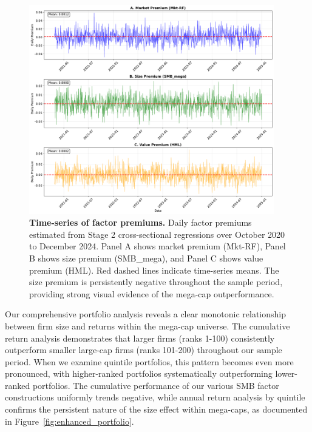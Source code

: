 \documentclass[10pt,letterpaper]{article}
\begin{document}
\begin{figure}[!h]
\centering
\includegraphics[width=0.95\textwidth]{figures/fig2_premium_timeseries.pdf}
\caption{\textbf{Time-series of factor premiums.}
Daily factor premiums estimated from Stage 2 cross-sectional regressions over October 2020 to December 2024. Panel A shows market premium (Mkt-RF), Panel B shows size premium (SMB\_mega), and Panel C shows value premium (HML). Red dashed lines indicate time-series means. The size premium is persistently negative throughout the sample period, providing strong visual evidence of the mega-cap outperformance.}
\label{fig:premium_timeseries}
\end{figure}

Our comprehensive portfolio analysis reveals a clear monotonic relationship between firm size and returns within the mega-cap universe. The cumulative return analysis demonstrates that larger firms (ranks 1-100) consistently outperform smaller large-cap firms (ranks 101-200) throughout our sample period. When we examine quintile portfolios, this pattern becomes even more pronounced, with higher-ranked portfolios systematically outperforming lower-ranked portfolios. The cumulative performance of our various SMB factor constructions uniformly trends negative, while annual return analysis by quintile confirms the persistent nature of the size effect within mega-caps, as documented in Figure~\ref{fig:enhanced_portfolio}.
\end{document}
